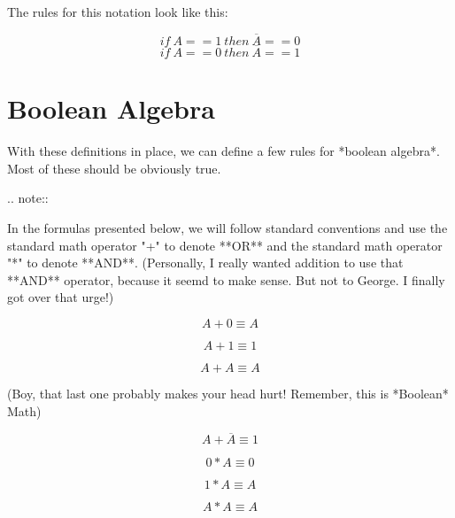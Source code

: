 The rules for this notation look like this:

\begin{equation}
    if\ A == 1\ then\ \overline{A} == 0
\end{equation}
\begin{equation}
    if\ A == 0\ then\ \overline{A} == 1
\end{equation}

\section{Boolean Algebra}

With these definitions in place, we can define a few rules for *boolean
algebra*. Most of these should be obviously true.

..  note::

    In the formulas presented below, we will follow standard conventions and
    use the standard math operator "+" to denote **OR** and the standard
    math operator "*" to denote **AND**. (Personally, I really wanted addition
    to use that **AND** operator, because it seemd to make sense. But not to
    George. I finally got over that urge!)

\begin{equation}
    A + 0 \equiv A
\end{equation}

\begin{equation}
    A + 1 \equiv 1
\end{equation}

\begin{equation}
    A + A \equiv A
\end{equation}

(Boy, that last one probably makes your head hurt! Remember, this is *Boolean*
Math)


\begin{equation}
    A + \overline{A} \equiv 1
\end{equation}

\begin{equation}
    0 * A \equiv 0
\end{equation}

\begin{equation}
    1 * A \equiv A
\end{equation}

\begin{equation}
    A * A \equiv A
\end{equation}

